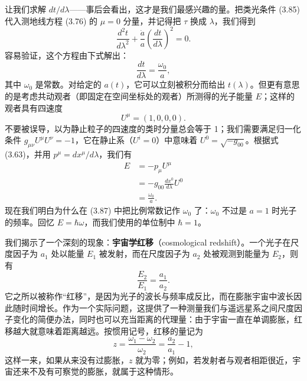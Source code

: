 让我们求解 $dt/d\lambda$——事后会看出，这才是我们最感兴趣的量。把类光条件 (3.85) 代入测地线方程 (3.76) 的 $\mu = 0$ 分量，并记得把 $\tau$ 换成 $\lambda$，我们得到
\begin{equation*}
\frac{d^2t}{d\lambda^2} + \frac{\dot{a}}{a}\left(\frac{dt}{d\lambda}\right)^2 = 0.
\tag{3.86}
\end{equation*}
容易验证，这个方程由下式解出：
\begin{equation*}
\frac{dt}{d\lambda} = \frac{\omega_0}{a},
\tag{3.87}
\end{equation*}
其中 $\omega_0$ 是常数。对给定的 $a(t)$，它可以立刻被积分而给出 $t(\lambda)$。但更有意思的是考虑共动观者（即固定在空间坐标处的观者）所测得的光子能量 $E$；这样的观者具有四速度
\begin{equation*}
U^\mu = (1, 0, 0, 0).
\tag{3.88}
\end{equation*}
不要被误导，以为静止粒子的四速度的类时分量总会等于 1；我们需要满足归一化条件 $g_{\mu\nu}U^\mu U^\nu = -1$，它在静止系（$U^i = 0$）中意味着 $U^0 = \sqrt{-g_{00}}$。根据式 (3.63)，并用 $p^\mu = dx^\mu/d\lambda$，我们有
\begin{align*}
E &= -p_\mu U^\mu\\
&= -g_{00}\frac{dx^0}{d\lambda}U^0\\
&= \frac{\omega_0}{a}.
\tag{3.89}
\end{align*}
现在我们明白为什么在 (3.87) 中把比例常数记作 $\omega_0$ 了：$\omega_0$ 不过是 $a = 1$ 时光子的频率。回忆 $E = \hbar\omega$，而我们使用的单位制中 $\hbar = 1$。

我们揭示了一个深刻的现象：\textbf{宇宙学红移}（cosmological redshift）。一个光子在尺度因子为 $a_1$ 处以能量 $E_1$ 被发射，而在尺度因子为 $a_2$ 处被观测到能量为 $E_2$，则有
\begin{equation*}
\frac{E_2}{E_1} = \frac{a_1}{a_2}.
\tag{3.90}
\end{equation*}
它之所以被称作“红移”，是因为光子的波长与频率成反比，而在膨胀宇宙中波长因此随时间增长。作为一个实际问题，这提供了一种测量我们与遥远星系之间尺度因子变化的简便办法，同时也可以充当距离的代理量：由于宇宙一直在单调膨胀，红移越大就意味着距离越远。按惯用记号，红移的量记为
\begin{equation*}
z = \frac{\omega_1 - \omega_2}{\omega_2} = \frac{a_2}{a_1} - 1,
\tag{3.91}
\end{equation*}
这样一来，如果从来没有过膨胀，$z$ 就为零；例如，若发射者与观者相距很近，宇宙还来不及有可察觉的膨胀，就属于这种情形。

